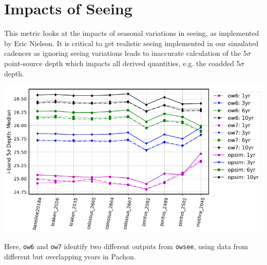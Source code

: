 \documentclass[a4paper,10pt]{article}
\newcommand{\ttt}[1]{\texttt{#1}}
\begin{document}
\newpage
\section*{Impacts of Seeing\label{seeing}}
This metric looks at the impacts of seasonal variations in seeing, as implemented by Eric Nielson. It is critical to get realistic seeing implemented in our simulated cadences as ignoring seeing variations leads to inaccurate calculation of the 5$\sigma$ point-source depth which impacts all derived quantities, e.g. the coadded 5$\sigma$ depth.

\begin{minipage}{\columnwidth}
\centering
\vspace*{2em}
\includegraphics[width=.75\columnwidth]{lss_compare_depth_median_10dbs_ow6_ow7_opsim.png}
\vspace*{2em}
\end{minipage}

Here, \ttt{ow6} and \ttt{ow7} identify two different outputs from \ttt{owsee}, using data from different but overlapping years in Pachon.
\end{document}
